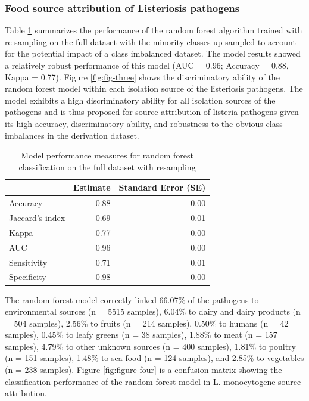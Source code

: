 \documentclass[
  10pt,
]{article}
\begin{document}
\hypertarget{food-source-attribution-of-listeriosis-pathogens}{%
\subsubsection{Food source attribution of Listeriosis pathogens}\label{food-source-attribution-of-listeriosis-pathogens}}

Table \ref{tab:four} summarizes the performance of the random forest algorithm trained with re-sampling on the full dataset with the minority classes up-sampled to account for the potential impact of a class imbalanced dataset. The model results showed a relatively robust performance of this model (AUC = 0.96; Accuracy = 0.88, Kappa = 0.77). Figure \ref{fig:fig-three} shows the discriminatory ability of the random forest model within each isolation source of the listeriosis pathogens. The model exhibits a high discriminatory ability for all isolation sources of the pathogens and is thus proposed for source attribution of listeria pathogens given its high accuracy, discriminatory ability, and robustness to the obvious class imbalances in the derivation dataset.

\begin{table}[H]

\caption{\label{tab:four}Model performance measures for random forest classification on the full dataset with resampling}
\centering
\begin{tabular}[t]{l|r|r}
\hline
\textbf{ } & \textbf{Estimate} & \textbf{Standard Error (SE)}\\
\hline
Accuracy & 0.88 & 0.00\\
\hline
Jaccard's index & 0.69 & 0.01\\
\hline
Kappa & 0.77 & 0.00\\
\hline
AUC & 0.96 & 0.00\\
\hline
Sensitivity & 0.71 & 0.01\\
\hline
Specificity & 0.98 & 0.00\\
\hline
\end{tabular}
\end{table}

The random forest model correctly linked 66.07\% of the pathogens to environmental sources (n = 5515 samples), 6.04\% to dairy and dairy products (n = 504 samples), 2.56\% to fruits (n = 214 samples), 0.50\% to humans (n = 42 samples), 0.45\% to leafy greens (n = 38 samples), 1.88\% to meat (n = 157 samples), 4.79\% to other unknown sources (n = 400 samples), 1.81\% to poultry (n = 151 samples), 1.48\% to sea food (n = 124 samples), and 2.85\% to vegetables (n = 238 samples). Figure \ref{fig:figure-four} is a confusion matrix showing the classification performance of the random forest model in L. monocytogene source attribution.
\end{document}
